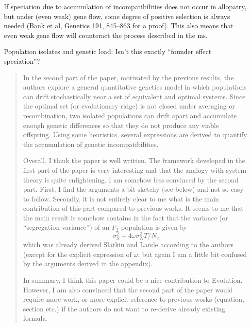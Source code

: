 \reply{
}

\begin{point}{}
    If speciation due to accumulation of incompatibilities does not occur in
allopatry, but under (even weak) gene flow, some degree of positive selection
is always needed (Bank et al, Genetics 191, 845–863 for a proof). This also
means that even weak gene flow will counteract the process described in the ms.
\end{point}

\reply{
}

\begin{point}{}
    Population isolates and genetic load: Isn't this exactly ``founder effect
speciation''?
\end{point}

\reply{
}



\begin{quote}
In the second part of the paper, motivated by the previous results, the authors explore a general
quantitative genetics model in which populations can drift stochastically near a set of equivalent
and optimal systems. Since the optimal set (or evolutionary ridge) is not closed under averaging or
recombination, two isolated populations can drift apart and accumulate enough genetic differences
so that they do not produce any viable offspring. Using some heuristics, several expressions are
derived to quantify the accumulation of genetic incompatibilities.

Overall, I think the paper is well written. The framework developed in the first part of the paper
is very interesting and that the analogy with system theory is quite enlightening. I am somehow
less convinced by the second part. First, I find the arguments a bit sketchy (see below) and not so
easy to follow. Secondly, it is not entirely clear to me what is the main contribution of this part
compared to previous works. It seems to me that the main result is somehow contains in the fact
that the variance (or ``segregation variance'') of an $F_2$ population is given by
$$\sigma^2_S + 4 \omega \sigma^2_N T / N_e$$
which was already derived Slatkin and Lande according to the authors (except for the explicit
expression of $\omega$, but again I am a little bit confused by the arguments derived in the appendix).

In summary, I think this paper could be a nice contribution to Evolution. However, I am also
convinced that the second part of the paper would require more work, or more explicit reference
to previous works (equation, section etc.) if the authors do not want to re-derive already existing
formula.
\end{quote}


